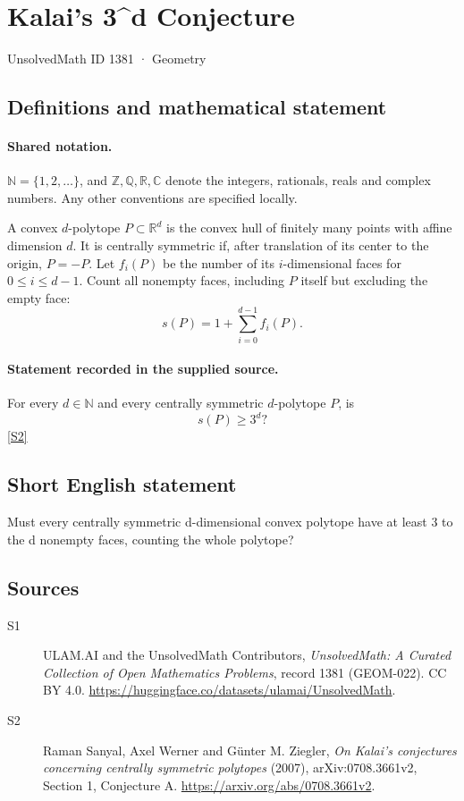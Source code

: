 \documentclass[11pt]{article}
\newcommand{\sref}[2]{\hyperlink{source:#1:#2}{[S#2]}}
\begin{document}
\setcounter{section}{1380}
\section{Kalai's 3\textasciicircum{}d Conjecture}\label{1381}
{\small\sffamily UnsolvedMath ID 1381 · Geometry}
\subsection{Definitions and mathematical statement}

\paragraph{Shared notation.}$\mathbb N=\{1,2,\ldots\}$, and $\mathbb Z,\mathbb Q,\mathbb R,\mathbb C$ denote the integers, rationals, reals and complex numbers. Any other conventions are specified locally.


A convex $d$-polytope $P\subset\mathbb R^d$ is the convex hull of finitely many points with affine dimension $d$. It is centrally symmetric if, after translation of its center to the origin, $P=-P$. Let $f_i(P)$ be the number of its $i$-dimensional faces for $0\le i\le d-1$. Count all nonempty faces, including $P$ itself but excluding the empty face:
\[
 s(P)=1+\sum_{i=0}^{d-1}f_i(P).
\]
\paragraph{Statement recorded in the supplied source.}
For every $d\in\mathbb N$ and every centrally symmetric $d$-polytope $P$, is
\[
 s(P)\ge3^d?
\]
\sref{1381}{2}
\subsection{Short English statement}
Must every centrally symmetric d-dimensional convex polytope have at least 3 to the d nonempty faces, counting the whole polytope?
\subsection{Sources}
\begin{description}
\item[\hypertarget{source:1381:1}{S1}] ULAM.AI and the UnsolvedMath Contributors, \emph{UnsolvedMath: A Curated Collection of Open Mathematics Problems}, record 1381 (GEOM-022). CC BY 4.0. \url{https://huggingface.co/datasets/ulamai/UnsolvedMath}.
\item[\hypertarget{source:1381:2}{S2}] Raman Sanyal, Axel Werner and Günter M. Ziegler, \emph{On Kalai's conjectures concerning centrally symmetric polytopes} (2007), arXiv:0708.3661v2, Section 1, Conjecture A. \url{https://arxiv.org/abs/0708.3661v2}.
\end{description}
\label{end:1381}
\end{document}

